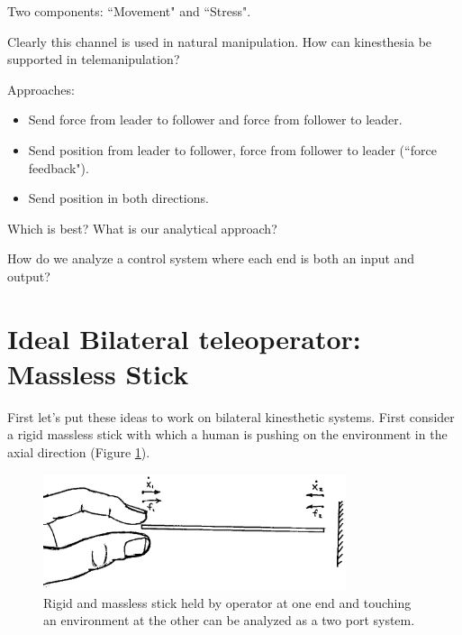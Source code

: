 Two components:  ``Movement" and ``Stress".

Clearly this channel is used in natural manipulation.    How can kinesthesia be supported in telemanipulation?



Approaches:
\begin{itemize}

\item Send force from leader to follower and force from follower to leader.
\item Send position from leader to follower, force from follower to leader (``force feedback").
\item Send position in both directions.

\end{itemize}

Which is best?   What is our analytical approach?

How do we analyze a control system where each end is both an input and output?





\section{Ideal Bilateral teleoperator: Massless Stick}

First let's put these ideas to work on bilateral kinesthetic systems.    First consider a rigid massless stick with which a human is pushing on the environment  in the axial direction (Figure \ref{MasslessStick}).


\begin{figure}[h]	%
 \centering \includegraphics[width=3.5in]{figs14/00312.eps}
\caption{Rigid and massless stick held by operator at one end and touching an environment at the other can be analyzed as a two port system.}\label{MasslessStick}	%
\end{figure}	%


